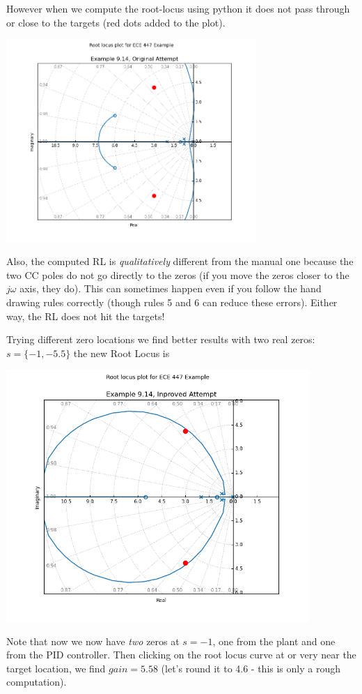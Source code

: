 \begin{ExampleCont}
However when we compute the root-locus using python
it does not pass through or close to the targets (red dots added to the plot).

\begin{center}
  \includegraphics[width=95mm]{figs09/R27J16.png}
\end{center}

Also, the computed RL is {\it qualitatively } different from the manual one because the two CC poles
do not go directly to the zeros (if you move the zeros closer to the $j\omega$ axis, they do).
This can sometimes happen even if you follow the hand drawing rules correctly
(though rules 5 and 6 can reduce these errors).   Either way, the RL does not hit the targets!

Trying different zero locations we find better results with two real
zeros: $s= \{-1,-5.5\}$
the new Root Locus is

\begin{center}
\includegraphics[width=115mm]{figs09/R27J17.png}
\end{center}

Note that now  we now have {\it two} zeros at $s=-1$, one from
the plant and one from the PID controller.   Then clicking on the root locus curve at or
very near the target location, we find $gain = 5.58$  (let's round it to 4.6
- this is only a rough computation).


\end{ExampleCont}
